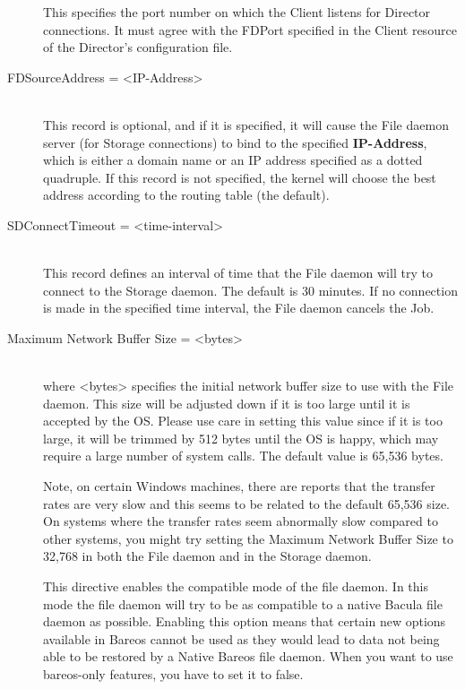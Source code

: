 \begin{description}
This specifies the port number  on which the Client listens for Director
connections. It must agree  with the FDPort specified in the Client resource
of the Director's  configuration file.


\item [FDSourceAddress = {\textless}IP-Address{\textgreater}] \hfill \\
This record is optional,  and if it is specified, it will cause the File
daemon server (for  Storage connections) to bind to the specified {\bf
IP-Address},  which is either a domain name or an IP address specified as a
dotted quadruple. If this record is not specified, the kernel will choose
the best address according to the routing table (the default).

\item [SDConnectTimeout = {\textless}time-interval{\textgreater}] \hfill \\
This  record defines an interval of time that  the File daemon will try to
connect to the  Storage daemon. The default is 30 minutes. If no connection
is made in the specified time interval, the File daemon  cancels the Job.

\item [Maximum Network Buffer Size = {\textless}bytes{\textgreater}] \hfill \\
where {\textless}bytes{\textgreater} specifies the initial network buffer  size to use with
the File daemon. This size will be adjusted down  if it is too large until it
is accepted by the OS. Please use  care in setting this value since if it is
too large, it will  be trimmed by 512 bytes until the OS is happy, which may
require  a large number of system calls. The default value is 65,536 bytes.

Note, on certain Windows machines, there are reports that the
transfer rates are very slow and this seems to be related to
the default 65,536 size. On systems where the transfer rates
seem abnormally slow compared to other systems, you might try
setting the Maximum Network Buffer Size to 32,768 in both the
File daemon and in the Storage daemon.

This directive enables the compatible mode of the file daemon. In
this mode the file daemon will try to be as compatible to a native
Bacula file daemon as possible. Enabling this option means that
certain new options available in Bareos cannot be used as they would
lead to data not being able to be restored by a Native Bareos file daemon.
When you want to use bareos-only features, you have to set it to false.


\end{description}

